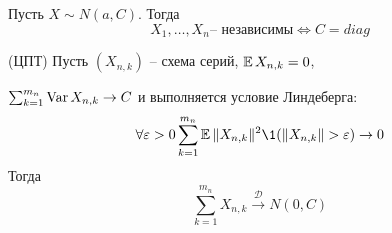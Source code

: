     \begin{col}
        Пусть $X\sim N(a, C)$. Тогда
        \begin{equation*}
            X_1, \dots, X_n \text{-- независимы} \iff  C = diag
        \end{equation*}
    \end{col}

    \begin{theorem}
        (ЦПТ) Пусть $(X_{n, k})$ -- схема серий, $\operatorname*{\mathbb{E}} X_{n, k} = 0$, 
        
        $\sum_{k=1}^{m_n} \operatorname*{Var} X_{n,k} \to C$ и выполняется условие Линдеберга:
        \begin{equation*}
            \forall \varepsilon > 0 \sum_{k=1}^{m_n} \E \|X_{n, k}\|^2 \1(\|X_{n, k}\| > \varepsilon) \to 0
        \end{equation*}
        Тогда \begin{equation*}
            \sum_{k=1}^{m_n} X_{n, k} \overset{\mathcal{D}}{\to} N(0, C)
        \end{equation*}
    \end{theorem}